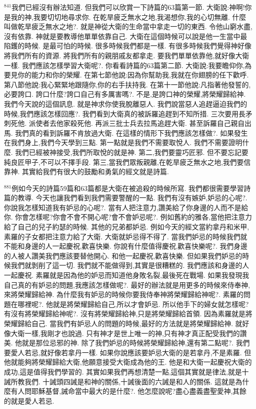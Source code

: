 \documentclass{book}
\begin{document}
$^{841}$我們已經沒有辦法知道.
但我們可以欣賞一下詩篇的63篇第一節.
大衛說:神啊!你是我的神,我要切切地尋求你.
在乾旱疲乏無水之地,我渴想你,我的心切無離.
什麼叫做乾旱疲乏無水之地?.
就是神從大衛的生命當中拿走一切的東西.
令他山窮水盡,沒有依靠.
神就是要教導他單單依靠自己.
大衛在這個時候可以說是他一生當中最陷鑊的時候.
是最可怕的時候.
很多時候我們都是一樣.
有很多時候我們覺得神好像將我們所有的資源.
將我們所有的親朋戚友都拿走.
要我們單單依靠他,就好像大衛一樣.
我們應該怎樣學習大衛呢?.
你看看詩篇的63篇第二節.
大衛說:我要瞻仰你,為要見你的能力和你的榮耀.
在第七節他說:因為你幫助我,我就在你翅膀的任下歡呼.
第八節他說:我心緊緊地跟隨你,你的右手扶持我.
在第十一節他說:凡指著他發誓的,必要誇口.
誇口什麼?誇口自己有多厲害嗎?.
不是,是誇口神的榮耀,將榮耀歸給神.
我們今天說的這個訊息.
就是神求你使我脫離惡人.
我們說當惡人追趕逼迫我們的時候,我們應該怎樣回應?.
我們看到大衛真的被訴羅追趕到不知所措.
三次要用長矛刺死他.
派使者去他家殺死他.
再派三批士兵去拉馬追趕大衛.
甚至訴羅自己親自出馬.
我們真的看到訴羅不肯放過大衛.
在這樣的情形下我們應該怎樣做?.
如果發生在我們身上,我們今天學到三點.
第一點就是我們不需要取悅人.
我們不需要證明什麼.
我們已經被神接受,我們所取悅的就是神.
第二,我們要靈巧匠邪.
但不要忘記要純良匠甲子,不可以不擇手段.
第三,當我們眾叛親離,在乾旱疲乏無水之地,我們要信靠神.
其實給我們有很大的鼓勵和勇氣的經文就是詩篇.

$^{881}$例如今天的詩篇59篇和63篇都是大衛在被追殺的時候所寫.
我們都很需要學習詩篇的教導.
今天也讓我們看到我們需要警醒的一點.
我們有沒有嫉妒,妒忌的心呢?.
你說我怎樣知道我有妒忌的心呢?.
當有人把注意力,讚美給了你身邊的人而不是給你.
你會怎樣呢?你會不會不開心呢?會不會妒忌呢?.
例如舊約的雅各,當他把注意力給了自己的兒子約瑟的時候.
其他的兄弟都妒忌.
例如今天的經文當約拿丹和米甲,素羅的子女都把注意力給了大衛.
大衛就妒忌得不得了.
當我們妒忌的時候我們就不能和身邊的人一起慶祝,歡喜快樂.
你說有什麼值得慶祝,歡喜快樂呢?.
我們身邊的人被人讚美我們應該要替他開心.
和他一起慶祝,歡喜快樂.
但如果我們妒忌的時候我們就剝削了這一切.
我們就不能做得到,其實是很糟糕的.
我們應該和身邊的人一起慶祝.
素羅就是因為他的妒忌而知道他身敗名裂,最後死在戰場.
如果我發現我自己真的有妒忌的問題,我應該怎樣做呢?.
最好的辦法就是用更多的時候來侍奉神,來將榮耀歸給神.
為什麼我有妒忌的時候你要我侍奉神將榮耀歸給神呢?.
素羅的問題在哪裡呢?.
他就是將榮耀歸給自己,所以才會妒忌.
所以他手下的婦女就怎樣呢?有沒有將榮耀歸給神呢?.
沒有將榮耀歸給神,只是將榮耀歸給首領.
因為素羅就是將榮耀歸給自己.
當我們有妒忌人的問題的時候,最好的方法就是將榮耀歸給神.
就好像大衛一樣,我剛才也說過.
只有神才是世上唯一的神,只有神才真正配受我們的讚美.
他就是那位忌邪的神.
除了我們妒忌的時候將榮耀歸給神,還有第二點呢?.
我們要愛人若忌,就好像若拿丹一樣.
如果你說應該要妒忌大衛的是若拿丹,不是素羅.
但他就能夠將榮耀歸給大衛,他願意接受大衛成為他的王.
他是和大衛一起慶祝大衛的成功,這是值得我們學習的.
其實如果我們再想清楚一點,這個其實就是律法,就是十誡所教我們.
十誡頭四誡是和神的關係,十誡後面的六誡是和人的關係.
這就是為什麼有人問耶穌基督,誡命當中最大的是什麼?.
他怎麼說呢?盡心盡義盡聖愛神,其餘的就是愛人若忌.
\end{document}
